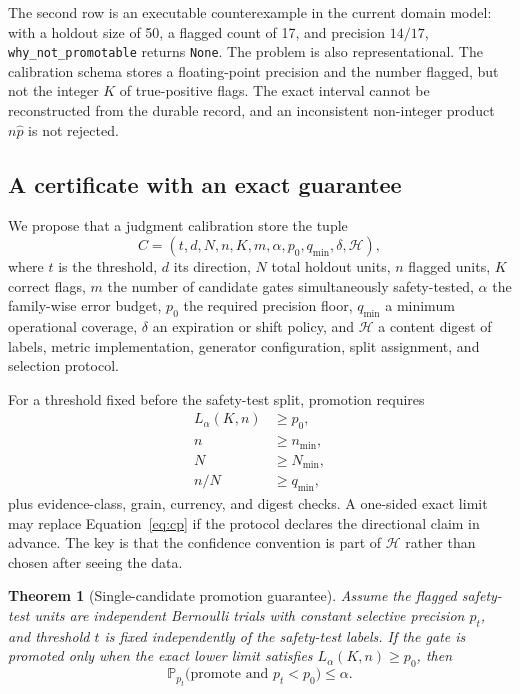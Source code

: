 \documentclass[11pt]{article}
\newtheorem{theorem}[definition]{Theorem}
\newcommand{\code}[1]{\texttt{#1}}
\newcommand{\Prob}{\mathbb{P}}
\begin{document}
The second row is an executable counterexample in the current domain model: with a holdout
size of 50, a flagged count of 17, and precision $14/17$,
\code{why\_not\_promotable} returns \code{None}. The problem is
also representational. The calibration schema stores a floating-point precision and the
number flagged, but not the integer $K$ of true-positive flags. The exact interval cannot be
reconstructed from the durable record, and an inconsistent non-integer product
$n\widehat p$ is not rejected.

\subsection{A certificate with an exact guarantee}

We propose that a judgment calibration store the tuple
\[
 C=(t,d,N,n,K,m,\alpha,p_0,q_{\min},\delta,\mathcal{H}),
\]
where $t$ is the threshold, $d$ its direction, $N$ total holdout units, $n$ flagged units,
$K$ correct flags, $m$ the number of candidate gates simultaneously safety-tested,
$\alpha$ the family-wise error budget, $p_0$ the required precision floor, $q_{\min}$ a
minimum operational coverage, $\delta$ an expiration or shift policy, and $\mathcal{H}$ a
content digest of labels, metric implementation, generator configuration, split assignment,
and selection protocol.

For a threshold fixed before the safety-test split, promotion requires
\begin{align}
  L_{\alpha}(K,n)&\ge p_0, \label{eq:single}\\
  n&\ge n_{\min},\\
  N&\ge N_{\min},\\
  n/N&\ge q_{\min},
\end{align}
plus evidence-class, grain, currency, and digest checks. A one-sided exact limit may replace
Equation~\eqref{eq:cp} if the protocol declares the directional claim in advance. The key is
that the confidence convention is part of $\mathcal{H}$ rather than chosen after seeing the
data.

\begin{theorem}[Single-candidate promotion guarantee]
\label{thm:singlecp}
Assume the flagged safety-test units are independent Bernoulli trials with constant selective
precision $p_t$, and threshold $t$ is fixed independently of the safety-test labels. If the
gate is promoted only when the exact lower limit satisfies
$L_{\alpha}(K,n)\ge p_0$, then
\[
 \Prob_{p_t}\bigl(\text{promote and }p_t<p_0\bigr)\le\alpha.
\]
\end{theorem}
\end{document}
